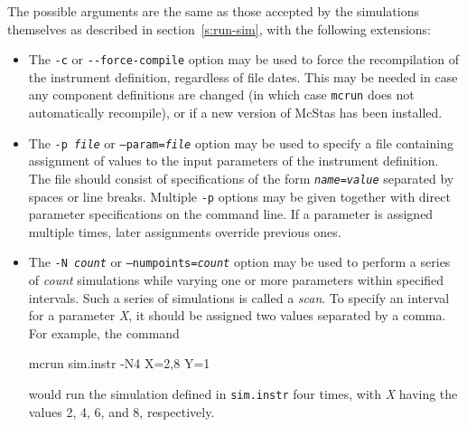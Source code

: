 The possible arguments are the same as those accepted by the simulations
themselves as described in section~\ref{s:run-sim}, with the following
extensions:
\begin{itemize}
\item The \verb+-c+ or \verb+--force-compile+ option may be used to force the
  recompilation of the instrument definition, regardless of file dates. This may
  be needed in case any component definitions are changed (in which case
  \verb+mcrun+ does not automatically recompile), or if a new version of McStas
  has been installed.
\item The \texttt{-p {\it file}} or \texttt{--param={\it file}} option may be
  used to specify a file containing assignment of values to the input parameters
  of the instrument definition. The file should consist of specifications of the
  form \texttt{{\it name\/}={\it value\/}} separated by spaces or line
  breaks. Multiple \verb+-p+ options may be given together with direct parameter
  specifications on the command line. If a parameter is assigned multiple times,
  later assignments override previous ones.
\item The \texttt{-N {\it count}} or \texttt{--numpoints={\it count}} option
  may be used to perform a series of \textit{count\/} simulations while
  varying one or more parameters within specified intervals. Such a
  series of simulations is called a \emph{scan}. To specify
  an interval for a parameter \textit{X}, it should be assigned two
  values separated by a comma. For example, the command
\begin{bash}
mcrun sim.instr -N4 X=2,8 Y=1
\end{bash}
would run the simulation defined in \verb+sim.instr+ four times, with
\textit{X} having the values 2, 4, 6, and 8, respectively.


\end{itemize}
